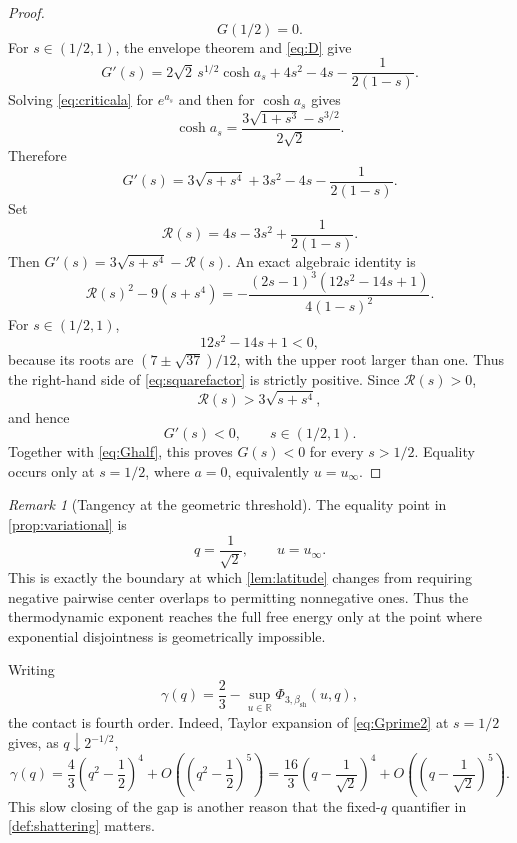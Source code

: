 \documentclass[11pt,reqno]{amsart}
\numberwithin{equation}{section}
\theoremstyle{plain}
\theoremstyle{definition}
\theoremstyle{remark}
\newtheorem{remark}[remark]{Remark}
\newcommand{\R}{\mathbb R}
\newcommand{\1}{\mathbf 1}
\newcommand{\bsh}{\beta_{\mathrm{sh}}}
\begin{document}
\begin{proof}
\begin{equation}\label{eq:Ghalf}
 G(1/2)=0.
\end{equation}
For \(s\in(1/2,1)\), the envelope theorem and \eqref{eq:D} give
\begin{equation}\label{eq:Gprime1}
 G'(s)
 =2\sqrt2\,s^{1/2}\cosh a_s+4s^2-4s-\frac1{2(1-s)}.
\end{equation}
Solving \eqref{eq:criticala} for \(e^{a_s}\) and then for \(\cosh a_s\) gives
\begin{equation}\label{eq:coshas}
 \cosh a_s
 =\frac{3\sqrt{1+s^3}-s^{3/2}}{2\sqrt2}.
\end{equation}
Therefore
\begin{equation}\label{eq:Gprime2}
 G'(s)
 =3\sqrt{s+s^4}+3s^2-4s-\frac1{2(1-s)}.
\end{equation}
Set
\begin{equation}\label{eq:Rdef}
 \mathcal R(s)=4s-3s^2+\frac1{2(1-s)}.
\end{equation}
Then \(G'(s)=3\sqrt{s+s^4}-\mathcal R(s)\).  An exact algebraic identity is
\begin{equation}\label{eq:squarefactor}
 \mathcal R(s)^2-9(s+s^4)
 =-\frac{(2s-1)^3(12s^2-14s+1)}{4(1-s)^2}.
\end{equation}
For \(s\in(1/2,1)\),
\[
 12s^2-14s+1<0,
\]
because its roots are \((7\pm\sqrt{37})/12\), with the upper root larger than one.  Thus the right-hand side of \eqref{eq:squarefactor} is strictly positive.  Since \(\mathcal R(s)>0\),
\[
 \mathcal R(s)>3\sqrt{s+s^4},
\]
and hence
\begin{equation}\label{eq:Gnegative}
 G'(s)<0,
 \qquad s\in(1/2,1).
\end{equation}
Together with \eqref{eq:Ghalf}, this proves \(G(s)<0\) for every \(s>1/2\).  Equality occurs only at \(s=1/2\), where \(a=0\), equivalently \(u=u_\infty\).
\end{proof}

\begin{remark}[Tangency at the geometric threshold]\label{rem:tangency}
The equality point in \cref{prop:variational} is
\[
 q=\frac1{\sqrt2},
 \qquad
 u=u_\infty.
\]
This is exactly the boundary at which \cref{lem:latitude} changes from requiring negative pairwise center overlaps to permitting nonnegative ones.  Thus the thermodynamic exponent reaches the full free energy only at the point where exponential disjointness is geometrically impossible.

Writing
\[
 \gamma(q)=\frac23-\sup_{u\in\R}\Phi_{3,\bsh}(u,q),
\]
the contact is fourth order.  Indeed, Taylor expansion of
\eqref{eq:Gprime2} at \(s=1/2\) gives, as \(q\downarrow2^{-1/2}\),
\begin{equation}\label{eq:gapExpansion}
 \gamma(q)=\frac43\left(q^2-\frac12\right)^4
 +O\left(\left(q^2-\frac12\right)^5\right)
 =\frac{16}{3}\left(q-\frac1{\sqrt2}\right)^4
 +O\left(\left(q-\frac1{\sqrt2}\right)^5\right).
\end{equation}
This slow closing of the gap is another reason that the fixed-\(q\)
quantifier in \cref{def:shattering} matters.
\end{remark}
\end{document}
